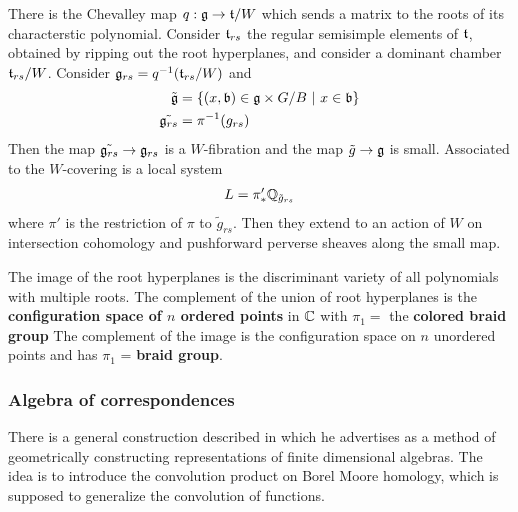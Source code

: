 \documentclass[12pt]{article}
\begin{document}
\hfill

There is the Chevalley map $q:\mathfrak{g}\to \mathfrak{t}/W$ which sends a 
matrix to the roots of its characterstic polynomial. Consider $\mathfrak{t}_{rs}$
the regular semisimple elements of $\mathfrak{t}$, obtained by ripping out the 
root hyperplanes, and consider a dominant chamber $\mathfrak{t}_{rs}/W$.
Consider $\mathfrak{g}_{rs} = q^{-1}(\mathfrak{t}_{rs}/W)$ and 
\begin{align*}
    \tilde{\mathfrak{g}}  &= \{(x,\mathfrak{b})\in \mathfrak{g}\times G/B \ \vert \  x\in \mathfrak{b}\} \\
    \tilde{\mathfrak{g}_{rs}} &= \pi^{-1}(g_{rs})
\end{align*} 
Then the map $\tilde{\mathfrak{g}_{rs}} \to \mathfrak{g}_{rs}$ is a $W$-fibration and 
the map $\tilde g \to \mathfrak{g}$ is small. Associated to the $W$-covering is 
a local system \begin{align*}
    L = \pi'_*\mathbb{Q}_{\tilde g_{rs}}
\end{align*} where $\pi'$ is the restriction of $\pi$ to $\tilde g_{rs}$.
Then they extend to an action of $W$ on intersection cohomology and pushforward perverse
sheaves along the small map.

\begin{remark}
    The image of the root hyperplanes is the discriminant variety of all polynomials
    with multiple roots. The complement of the union of root hyperplanes is 
    the \textbf{configuration space of $n$ ordered points} in $\mathbb{C}$ with $\pi_1 = $ the \textbf{
        colored braid group
    } The complement of the image is the configuration space on $n$ unordered points and
    has $\pi_1$ = \textbf{braid group}.
\end{remark}

\subsubsection{Algebra of correspondences}
There is a general construction described in \cite{ginzburg} 
which he advertises as a method of geometrically constructing 
representations of finite dimensional algebras. The idea is to
introduce the convolution product on Borel Moore homology, which is 
supposed to generalize the convolution of functions. 
\end{document}
